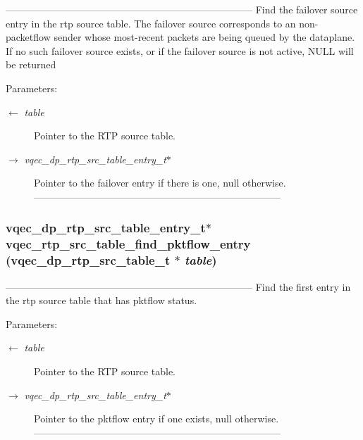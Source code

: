 --------------------------------------------------------------------------- Find the failover source entry in the rtp source table. The failover source corresponds to an non-packetflow sender whose most-recent packets are being queued by the dataplane. If no such failover source exists, or if the failover source is not active, NULL will be returned

\begin{Desc}
\item[Parameters:]
\begin{description}
\item[\mbox{$\leftarrow$} {\em table}]Pointer to the RTP source table. \item[\mbox{$\rightarrow$} {\em vqec\_\-dp\_\-rtp\_\-src\_\-table\_\-entry\_\-t$\ast$}]Pointer to the failover entry if there is one, null otherwise. --------------------------------------------------------------------------- \end{description}
\end{Desc}
\subsubsection{\setlength{\rightskip}{0pt plus 5cm}vqec\_\-dp\_\-rtp\_\-src\_\-table\_\-entry\_\-t$\ast$ vqec\_\-rtp\_\-src\_\-table\_\-find\_\-pktflow\_\-entry (vqec\_\-dp\_\-rtp\_\-src\_\-table\_\-t $\ast$ {\em table})}\label{vqec__rtp_8h_fc26268188d656d4079859e4044881c0}


--------------------------------------------------------------------------- Find the first entry in the rtp source table that has pktflow status.

\begin{Desc}
\item[Parameters:]
\begin{description}
\item[\mbox{$\leftarrow$} {\em table}]Pointer to the RTP source table. \item[\mbox{$\rightarrow$} {\em vqec\_\-dp\_\-rtp\_\-src\_\-table\_\-entry\_\-t$\ast$}]Pointer to the pktflow entry if one exists, null otherwise. --------------------------------------------------------------------------- \end{description}
\end{Desc}
